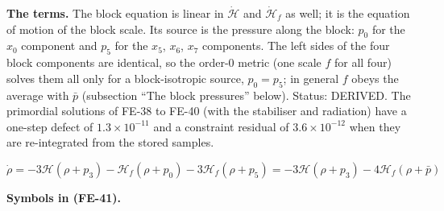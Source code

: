 \documentclass[
  10pt,
]{article}
\begin{document}
\textbf{The terms.} The block equation is linear in
\(\dot{\mathcal{H}}\) and \(\dot{\mathcal{H}}_f\) as well; it is the
equation of motion of the block scale. Its source is the pressure along
the block: \(p_0\) for the \(x_0\) component and \(p_5\) for the
\(x_5\), \(x_6\), \(x_7\) components. The left sides of the four block
components are identical, so the order-0 metric (one scale \(f\) for all
four) solves them all only for a block-isotropic source, \(p_0 = p_5\);
in general \(f\) obeys the average with \(\bar p\) (subsection ``The
block pressures'' below). Status: DERIVED. The primordial solutions of
FE-38 to FE-40 (with the stabiliser and radiation) have a one-step
defect of \(1.3\times10^{-11}\) and a constraint residual of
\(3.6\times10^{-12}\) when they are re-integrated from the stored
samples.

\[
\dot\rho = -3\mathcal{H}(\rho + p_3) - \mathcal{H}_f(\rho + p_0) - 3\mathcal{H}_f(\rho + p_5)
 = -3\mathcal{H}(\rho + p_3) - 4\mathcal{H}_f(\rho + \bar p) \tag{FE-41}
\]

\textbf{Symbols in (FE-41).}
\end{document}
